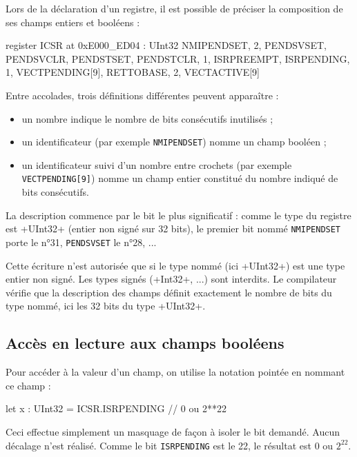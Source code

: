 

Lors de la déclaration d'un registre, il est possible de préciser la composition de ses champs entiers et booléens :
\begin{PLM}
register ICSR at 0xE000_ED04 : UInt32 {
  NMIPENDSET, 2, PENDSVSET, PENDSVCLR, PENDSTSET, PENDSTCLR, 1,
  ISRPREEMPT, ISRPENDING, 1, VECTPENDING[9], RETTOBASE, 2, VECTACTIVE[9]
}
\end{PLM}

Entre accolades, trois définitions différentes peuvent apparaître :
\begin{itemize}
\item un nombre indique le nombre de bits consécutifs inutilisés ;
\item un identificateur (par exemple \texttt{NMIPENDSET}) nomme un champ booléen ;
\item un identificateur suivi d'un nombre entre crochets (par exemple \texttt{VECTPENDING[9]}) nomme un champ entier constitué du nombre indiqué de bits consécutifs.
\end{itemize}

La description commence par le bit le plus significatif : comme le type du registre est \plm+UInt32+ (entier non signé sur 32 bits), le premier bit nommé \texttt{NMIPENDSET} porte le n°31, \texttt{PENDSVSET} le n°28, ...

Cette écriture n'est autorisée que si le type nommé (ici \plm+UInt32+) est une type entier non signé. Les types signés (\plm+Int32+, ...) sont interdits. Le compilateur vérifie que la description des champs définit exactement le nombre de bits du type nommé, ici les 32 bits du type \plm+UInt32+.










\subsection{Accès en lecture aux champs booléens}
Pour accéder à la valeur d'un champ, on utilise la notation pointée en nommant ce champ :
\begin{PLM}
let x : UInt32 = ICSR.ISRPENDING // 0 ou 2**22
\end{PLM}
Ceci effectue simplement un masquage de façon à isoler le bit demandé. Aucun décalage n'est réalisé. Comme le bit \texttt{ISRPENDING} est le 22, le résultat est $0$ ou $2^{22}$.

